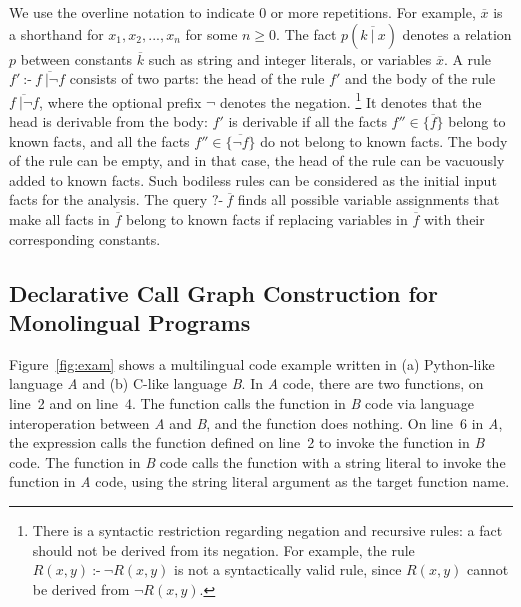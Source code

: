 \noindent
We use the overline notation to indicate 0 or more repetitions. 
For example, $\overline{x}$ is a shorthand for $x_1, x_2, ..., x_n$ for some $n
\ge 0$. 
The fact $p(\overline{k\ |\ x})$ denotes a relation $p$ between constants
$\overline{k}$ such as string and integer literals, or variables
$\overline{x}$. 
A rule $f'\
\mbox{:-}\ \overline{f\ |\neg f}$ consists of two parts: the head of the rule
$f'$ and the body of the rule $\overline{f\ |\neg f}$, where the
optional prefix $\neg$ denotes the negation.
\footnote{There is a syntactic restriction regarding negation and recursive
rules: a fact should not be derived from its negation. For example, the rule
$R(x, y)\ \mbox{:-}\ \neg R(x, y)$ is not a syntactically valid rule, since
$R(x, y)$ cannot be derived from $\neg R(x, y)$.}
It denotes that the head is derivable from the body:
$f'$ is derivable if all the facts $f'' \in \{\overline{f}\}$ belong to known
facts, and all the facts $f'' \in \{\overline{\neg f}\}$ do not belong to known
facts.
The body of the rule can be empty, and in that case, the head of the rule can
be vacuously added to known facts.
Such bodiless rules can be considered as the initial input facts for the
analysis.
The query $\mbox{?-}\ \overline{f}$ finds all possible variable assignments
that make all facts in $\overline{f}$ belong to known facts if replacing
variables in $\overline{f}$ with their corresponding constants.


\subsection{Declarative Call Graph Construction for Monolingual Programs}\label{lab:ovmono}
Figure~\ref{fig:exam} shows a multilingual code example written in (a)
Python-like language {\it A} and (b) C-like language {\it B}. In {\it A} code, there
are two functions,  on line~2 and \rcode{m2} on line~4. The function \rcode{
m1} calls the function \rcode{f} in {\it B} code via language interoperation between
{\it A} and {\it B}, and the function \rcode{m2} does nothing. On line~6 in {\it
A}, the expression \rcode{m1()} calls the function \rcode{m1} defined on line~2 to
invoke the function  in {\it B} code.
The function \rcode{f} in {\it B} code calls the  function with a
string literal \rcode{"m2"} to invoke the function \rcode{m2} in {\it A} code, using the
string literal argument as the target function name.


